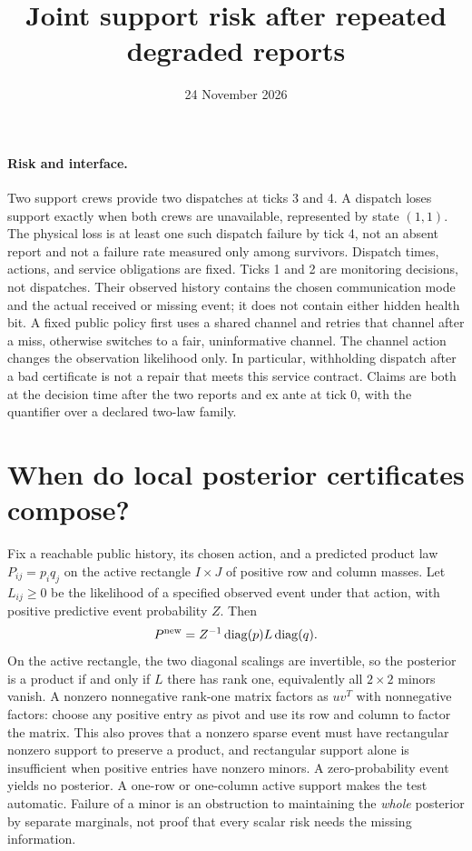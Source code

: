 \documentclass[11pt]{article}
\title{Joint support risk after repeated degraded reports}
\author{}
\date{24 November 2026}
\begin{document}
\maketitle

\paragraph{Risk and interface.}
Two support crews provide two dispatches at ticks 3 and 4. A dispatch loses support exactly when both crews are unavailable, represented by state $(1,1)$. The physical loss is at least one such dispatch failure by tick 4, not an absent report and not a failure rate measured only among survivors. Dispatch times, actions, and service obligations are fixed. Ticks 1 and 2 are monitoring decisions, not dispatches. Their observed history contains the chosen communication mode and the actual received or missing event; it does not contain either hidden health bit. A fixed public policy first uses a shared channel and retries that channel after a miss, otherwise switches to a fair, uninformative channel. The channel action changes the observation likelihood only. In particular, withholding dispatch after a bad certificate is not a repair that meets this service contract. Claims are both at the decision time after the two reports and ex ante at tick 0, with the quantifier over a declared two-law family.

\section{When do local posterior certificates compose?}
Fix a reachable public history, its chosen action, and a predicted product law $P_{ij}=p_iq_j$ on the active rectangle $I\times J$ of positive row and column masses. Let $L_{ij}\ge0$ be the likelihood of a specified observed event under that action, with positive predictive event probability $Z$. Then
\[
P^{\rm new}=Z^{-1}\operatorname{diag}(p)L\operatorname{diag}(q).
\]
On the active rectangle, the two diagonal scalings are invertible, so the posterior is a product if and only if $L$ there has rank one, equivalently all $2\times2$ minors vanish. A nonzero nonnegative rank-one matrix factors as $uv^T$ with nonnegative factors: choose any positive entry as pivot and use its row and column to factor the matrix. This also proves that a nonzero sparse event must have rectangular nonzero support to preserve a product, and rectangular support alone is insufficient when positive entries have nonzero minors. A zero-probability event yields no posterior. A one-row or one-column active support makes the test automatic. Failure of a minor is an obstruction to maintaining the \emph{whole} posterior by separate marginals, not proof that every scalar risk needs the missing information.
\end{document}
